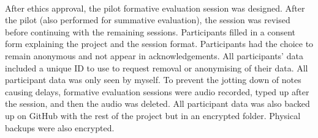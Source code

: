 \paragraph{} After ethics approval, the pilot formative evaluation session was designed. After the pilot (also performed for summative evaluation), the session was revised before continuing with the remaining sessions. Participants filled in a consent form explaining the project and the session format. Participants had the choice to remain anonymous and not appear in acknowledgements. All participants' data included a unique ID to use to request removal or anonymising of their data. All participant data was only seen by myself. To prevent the jotting down of notes causing delays, formative evaluation sessions were audio recorded, typed up after the session, and then the audio was deleted. All participant data was also backed up on GitHub with the rest of the project but in an encrypted folder. Physical backups were also encrypted.
